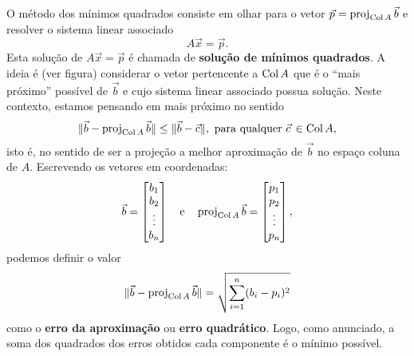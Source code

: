 \documentclass[../livro.tex]{subfiles}  %
\begin{document}
O método dos mínimos quadrados consiste em olhar para o vetor $\vec{p} = \operatorname{proj}_{\operatorname{Col} A} \vec{b}$ e resolver o sistema linear associado
\begin{equation}
A \vec{x} = \vec{p}.
\end{equation} Esta solução de $A \vec{x} = \vec{p}$ é chamada de \textbf{solução de mínimos quadrados}. A ideia é (ver figura) considerar o vetor pertencente a $\operatorname{Col} A$ que é o ``mais próximo'' possível de $\vec{b}$ e cujo sistema linear associado possua solução. Neste contexto, estamos pensando em mais próximo no sentido 
\begin{equation}
\| \vec{b} - \operatorname{proj}_{\operatorname{Col} A} \vec{b} \| \le \| \vec{b} - \vec{c} \|, \text{ para qualquer } \vec{c}\, \in \operatorname{Col} A,
\end{equation} isto é, no sentido de ser a projeção a melhor aproximação de $\vec{b}$ no espaço coluna de $A$. Escrevendo os vetores em coordenadas:
\begin{equation}
\vec{b} =
\begin{bmatrix}
  b_1 \\ b_2 \\ \vdots \\ b_n
\end{bmatrix} \quad \text{e} \quad 
\operatorname{proj}_{\operatorname{Col} A} \vec{b} =
\begin{bmatrix}
  p_1 \\ p_2 \\ \vdots \\ p_n
\end{bmatrix},
\end{equation} podemos definir o valor
\begin{equation}
\| \vec{b} - \operatorname{proj}_{\operatorname{Col} A} \vec{b} \| = \sqrt{\sum_{i=1}^n (b_i - p_i)^2}
\end{equation} como o \textbf{erro da aproximação} ou \textbf{erro  quadrático}. Logo, como anunciado, a soma dos quadrados dos erros obtidos cada componente é o mínimo possível.
\end{document}
